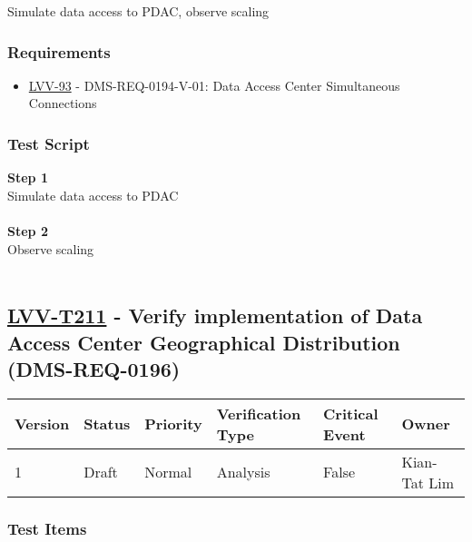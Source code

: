 Simulate data access to PDAC, observe scaling

\hypertarget{requirements-187}{%
\subsubsection{Requirements}\label{requirements-187}}

\begin{itemize}
\tightlist
\item
  \href{https://jira.lsstcorp.org/browse/LVV-93}{LVV-93} -
  DMS-REQ-0194-V-01: Data Access Center Simultaneous Connections
\end{itemize}

\hypertarget{test-script-187}{%
\subsubsection{Test Script}\label{test-script-187}}

\textbf{Step 1}\\
Simulate data access to PDAC\\
~\\
\textbf{Step 2}\\
Observe scaling\\
~\\

\hypertarget{lvv-t211---verify-implementation-of-data-access-center-geographical-distribution-dms-req-0196}{%
\subsection{\texorpdfstring{\href{https://jira.lsstcorp.org/secure/Tests.jspa\#/testCase/LVV-T211}{LVV-T211}
- Verify implementation of Data Access Center Geographical Distribution
(DMS-REQ-0196)}{LVV-T211 - Verify implementation of Data Access Center Geographical Distribution (DMS-REQ-0196)}}\label{lvv-t211---verify-implementation-of-data-access-center-geographical-distribution-dms-req-0196}}

\begin{longtable}[]{@{}llllll@{}}
\toprule
Version & Status & Priority & Verification Type & Critical Event &
Owner\tabularnewline
\midrule
\endhead
1 & Draft & Normal & Analysis & False & Kian-Tat Lim\tabularnewline
\bottomrule
\end{longtable}

\hypertarget{test-items-187}{%
\subsubsection{Test Items}\label{test-items-187}}

